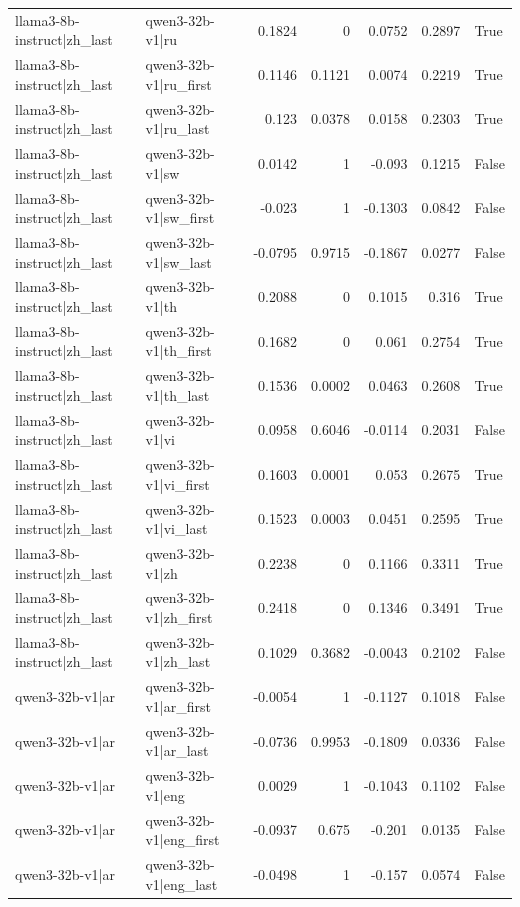 \begin{table}
\begin{tabular}{l l r r r r l}
llama3-8b-instruct|zh_last & qwen3-32b-v1|ru & 0.1824 & 0 & 0.0752 & 0.2897 & True \\
llama3-8b-instruct|zh_last & qwen3-32b-v1|ru_first & 0.1146 & 0.1121 & 0.0074 & 0.2219 & True \\
llama3-8b-instruct|zh_last & qwen3-32b-v1|ru_last & 0.123 & 0.0378 & 0.0158 & 0.2303 & True \\
llama3-8b-instruct|zh_last & qwen3-32b-v1|sw & 0.0142 & 1 & -0.093 & 0.1215 & False \\
llama3-8b-instruct|zh_last & qwen3-32b-v1|sw_first & -0.023 & 1 & -0.1303 & 0.0842 & False \\
llama3-8b-instruct|zh_last & qwen3-32b-v1|sw_last & -0.0795 & 0.9715 & -0.1867 & 0.0277 & False \\
llama3-8b-instruct|zh_last & qwen3-32b-v1|th & 0.2088 & 0 & 0.1015 & 0.316 & True \\
llama3-8b-instruct|zh_last & qwen3-32b-v1|th_first & 0.1682 & 0 & 0.061 & 0.2754 & True \\
llama3-8b-instruct|zh_last & qwen3-32b-v1|th_last & 0.1536 & 0.0002 & 0.0463 & 0.2608 & True \\
llama3-8b-instruct|zh_last & qwen3-32b-v1|vi & 0.0958 & 0.6046 & -0.0114 & 0.2031 & False \\
llama3-8b-instruct|zh_last & qwen3-32b-v1|vi_first & 0.1603 & 0.0001 & 0.053 & 0.2675 & True \\
llama3-8b-instruct|zh_last & qwen3-32b-v1|vi_last & 0.1523 & 0.0003 & 0.0451 & 0.2595 & True \\
llama3-8b-instruct|zh_last & qwen3-32b-v1|zh & 0.2238 & 0 & 0.1166 & 0.3311 & True \\
llama3-8b-instruct|zh_last & qwen3-32b-v1|zh_first & 0.2418 & 0 & 0.1346 & 0.3491 & True \\
llama3-8b-instruct|zh_last & qwen3-32b-v1|zh_last & 0.1029 & 0.3682 & -0.0043 & 0.2102 & False \\
qwen3-32b-v1|ar & qwen3-32b-v1|ar_first & -0.0054 & 1 & -0.1127 & 0.1018 & False \\
qwen3-32b-v1|ar & qwen3-32b-v1|ar_last & -0.0736 & 0.9953 & -0.1809 & 0.0336 & False \\
qwen3-32b-v1|ar & qwen3-32b-v1|eng & 0.0029 & 1 & -0.1043 & 0.1102 & False \\
qwen3-32b-v1|ar & qwen3-32b-v1|eng_first & -0.0937 & 0.675 & -0.201 & 0.0135 & False \\
qwen3-32b-v1|ar & qwen3-32b-v1|eng_last & -0.0498 & 1 & -0.157 & 0.0574 & False \\

\end{tabular}
\end{table}
